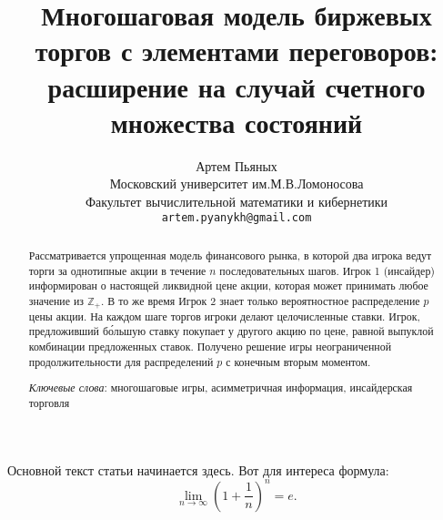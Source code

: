 \documentclass[12pt, draft]{extarticle}
\begin{document}
\title{Многошаговая модель биржевых торгов с элементами переговоров: расширение
  на случай счетного множества состояний%
}%
\author{%
  Артем Пьяных\\
  Московский университет им.М.В.Ломоносова\\
  Факультет вычислительной математики и кибернетики\\
  \texttt{artem.pyanykh@gmail.com}%
}%
\maketitle

\begin{abstract}
  Рассматривается упрощенная модель финансового рынка, в которой два игрока
  ведут торги за однотипные акции в течение $n$ последовательных шагов. Игрок 1
  (инсайдер) информирован о настоящей ликвидной цене акции, которая может
  принимать любое значение из $\mathbb{Z}_+$. В то же время Игрок 2 знает только
  вероятностное распределение $p$ цены акции. На каждом шаге торгов игроки
  делают целочисленные ставки. Игрок, предложивший б\'{о}льшую ставку покупает у
  другого акцию по цене, равной выпуклой комбинации предложенных ставок.
  Получено решение игры неограниченной продолжительности для распределений $p$ с
  конечным вторым моментом.

  \textit{Ключевые слова}: многошаговые игры, асимметричная информация,
  инсайдерская торговля
\end{abstract}

Основной текст статьи начинается здесь. Вот для интереса формула:
\begin{equation}
  \lim_{n\rightarrow\infty} \left( 1 + \frac{1}{n} \right)^n = e.
\end{equation}
\end{document}
